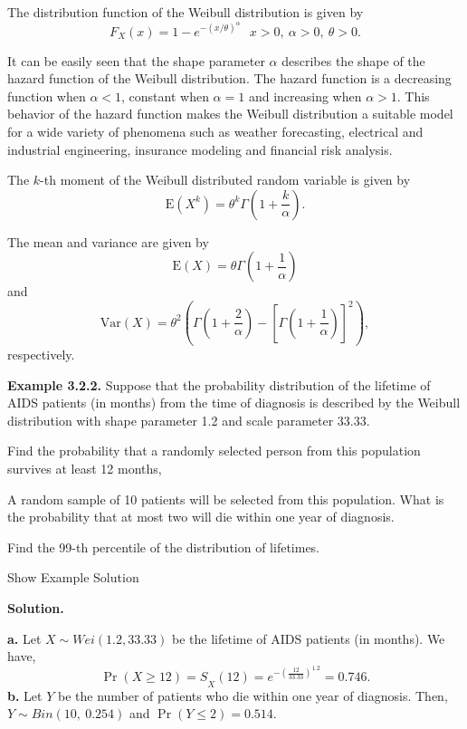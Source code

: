 \documentclass[]{book}
\theoremstyle{definition}
\theoremstyle{definition}
\theoremstyle{definition}
\theoremstyle{remark}
\begin{document}
The distribution function of the Weibull distribution is given by
\[F_{X}\left( x \right) = 1 - e^{- \left( x / \theta \right)^{\alpha}}  \ \ \ x >  0,\ \alpha >  0,\ \theta > 0.\]

It can be easily seen that the shape parameter \(\alpha\) describes the
shape of the hazard function of the Weibull distribution. The hazard
function is a decreasing function when \(\alpha < 1\), constant when
\(\alpha = 1\) and increasing when \(\alpha > 1\). This behavior of the
hazard function makes the Weibull distribution a suitable model for a
wide variety of phenomena such as weather forecasting, electrical and
industrial engineering, insurance modeling and financial risk analysis.

The \(k\)-th moment of the Weibull distributed random variable is given
by
\[\mathrm{E}\left( X^{k} \right) = \theta^{k}\Gamma\left( 1 + \frac{k}{\alpha} \right) .\]

The mean and variance are given by
\[\mathrm{E}\left( X \right) = \theta\Gamma\left( 1 + \frac{1}{\alpha} \right)\]
and
\[\mathrm{Var}(X)= \theta^{2}\left( \Gamma\left( 1 + \frac{2}{\alpha} \right)  - \left\lbrack \Gamma\left( 1 + \frac{1}{\alpha} \right) \right\rbrack  ^{2}\right),\]
respectively.

\textbf{Example 3.2.2.} Suppose that the probability distribution of the
lifetime of AIDS patients (in months) from the time of diagnosis is
described by the Weibull distribution with shape parameter 1.2 and scale
parameter 33.33.

Find the probability that a randomly selected person from this
population survives at least 12 months,

A random sample of 10 patients will be selected from this population.
What is the probability that at most two will die within one year of
diagnosis.

Find the 99-th percentile of the distribution of lifetimes.

Show Example Solution

\hypertarget{toggleExampleLoss.2.2}{}
\textbf{Solution.}

\textbf{a.} Let \(X \sim Wei \left( 1.2,33.33 \right)\) be the lifetime
of AIDS patients (in months). We have,
\[{\Pr\left( X \geq 12 \right) = S}_{X}\left( 12 \right) = e^{- \left( \frac{12}{33.33} \right)^{1.2}} = 0.746.\]
\textbf{b.} Let \(Y\) be the number of patients who die within one year
of diagnosis. Then, \(Y\sim Bin\left( 10,\ 0.254 \right)\) and
\(\Pr\left( Y \leq 2 \right) = 0.514.\)
\end{document}
